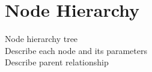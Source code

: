 \section{Node Hierarchy}
Node hierarchy tree \\
Describe each node and its parameters \\
Describe parent relationship \\
